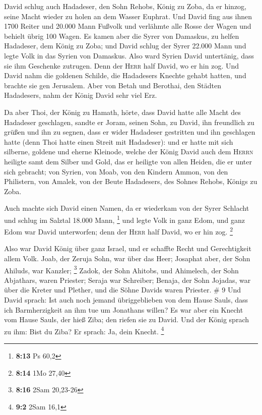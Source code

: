  David schlug auch Hadadeser, den Sohn Rehobs, König zu
Zoba, da er hinzog, seine Macht wieder zu holen an dem Wasser Euphrat.
 Und David fing aus ihnen 1700 Reiter und 20.000 Mann
Fußvolk und verlähmte alle Rosse der Wagen und behielt übrig 100 Wagen.
 Es kamen aber die Syrer von Damaskus, zu helfen
Hadadeser, dem König zu Zoba; und David schlug der Syrer 22.000 Mann
 und legte Volk in das Syrien von Damaskus. Also ward
Syrien David untertänig, dass sie ihm Geschenke zutrugen. Denn der
\textsc{Herr} half David, wo er hin zog.  Und David nahm
die goldenen Schilde, die Hadadesers Knechte gehabt hatten, und brachte
sie gen Jerusalem.  Aber von Betah und Berothai, den
Städten Hadadesers, nahm der König David sehr viel Erz.

 Da aber Thoi, der König zu Hamath, hörte, dass David
hatte alle Macht des Hadadeser geschlagen,  sandte er
Joram, seinen Sohn, zu David, ihn freundlich zu grüßen und ihn zu
segnen, dass er wider Hadadeser gestritten und ihn geschlagen hatte
(denn Thoi hatte einen Streit mit Hadadeser): und er hatte mit sich
silberne, goldene und eherne Kleinode,  welche der König
David auch dem \textsc{Herrn} heiligte samt dem Silber und Gold, das er
heiligte von allen Heiden, die er unter sich gebracht; 
von Syrien, von Moab, von den Kindern Ammon, von den Philistern, von
Amalek, von der Beute Hadadesers, des Sohnes Rehobs, Königs zu Zoba.

 Auch machte sich David einen Namen, da er wiederkam von
der Syrer Schlacht und schlug im Salztal 18.000 Mann, \footnote{\textbf{8:13}
  Ps 60,2}  und legte Volk in ganz Edom, und ganz Edom
war David unterworfen; denn der \textsc{Herr} half David, wo er hin zog.
\footnote{\textbf{8:14} 1Mo 27,40}

 Also war David König über ganz Israel, und er schaffte
Recht und Gerechtigkeit allem Volk.  Joab, der Zeruja
Sohn, war über das Heer; Josaphat aber, der Sohn Ahiluds, war Kanzler;
\footnote{\textbf{8:16} 2Sam 20,23-26}  Zadok, der Sohn
Ahitobs, und Ahimelech, der Sohn Abjathars, waren Priester; Seraja war
Schreiber;  Benaja, der Sohn Jojadas, war über die Kreter
und Plether, und die Söhne Davids waren Priester. \# 9 
Und David sprach: Ist auch noch jemand übriggeblieben von dem Hause
Sauls, dass ich Barmherzigkeit an ihm tue um Jonathans willen?
 Es war aber ein Knecht vom Hause Sauls, der hieß Ziba;
den riefen sie zu David. Und der König sprach zu ihm: Bist du Ziba? Er
sprach: Ja, dein Knecht. \footnote{\textbf{9:2} 2Sam 16,1}

